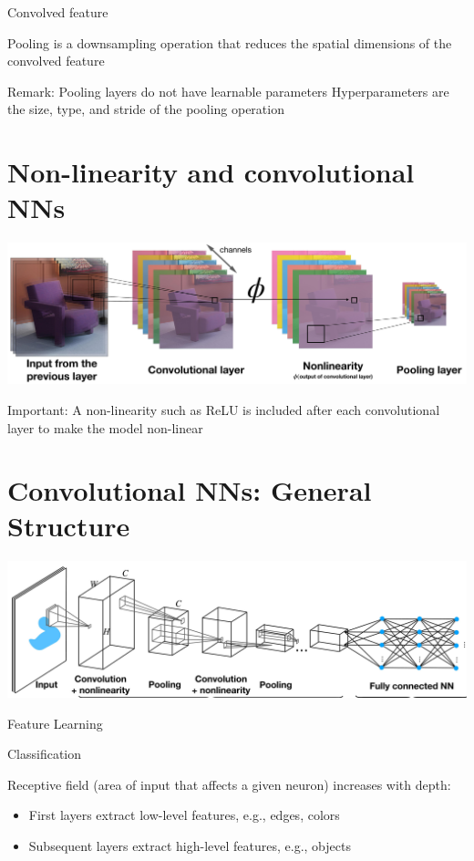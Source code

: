 \documentclass[10pt]{article}
\begin{document}
Convolved feature

Pooling is a downsampling operation that reduces the spatial dimensions of the convolved feature

Remark: Pooling layers do not have learnable parameters Hyperparameters are the size, type, and stride of the pooling operation

\section*{Non-linearity and convolutional NNs}
\begin{center}
\includegraphics[max width=\textwidth]{2024_01_08_959e2db67a31f073f6d2g-11}
\end{center}

Important: A non-linearity such as ReLU is included after each convolutional layer to make the model non-linear

\section*{Convolutional NNs: General Structure}
\begin{center}
\includegraphics[max width=\textwidth]{2024_01_08_959e2db67a31f073f6d2g-12}
\end{center}

Feature Learning

Classification

Receptive field (area of input that affects a given neuron) increases with depth:

\begin{itemize}
  \item First layers extract low-level features, e.g., edges, colors
  \item Subsequent layers extract high-level features, e.g., objects
\end{itemize}
\end{document}
